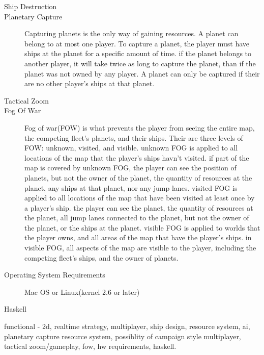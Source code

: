 \begin{description}
\item[Ship Destruction]






\item[Planetary Capture]
Capturing planets is the only way of gaining resources.
A planet can belong to at most one player.
To capture a planet, the player must have ships at the planet for a specific amount of time.
if the planet belongs to another player, it will take twice as long to capture the planet, than if the planet was not owned by any player.
A planet can only be captured if their are no other player's ships at that planet.


\item[Tactical Zoom]


\item[Fog Of War]
Fog of war(FOW) is what prevents the player from seeing the entire map, the competing fleet's planets, and their ships.
Their are three levels of FOW: unknown, visited, and visible.
unknown FOG is applied to all locations of the map that the player's ships havn't visited.
if part of the map is covered by unknown FOG, the player can see the position of planets, but not the owner of the planet, the quantity of resources at the planet, any ships at that planet, nor any jump lanes.
visited FOG is applied to all locations of the map that have been visited at least once by a player's ship.
the player can see the planet, the quantity of resources at the planet, all jump lanes connected to the planet, but not the owner of the planet, or the ships at the planet.
visible FOG is applied to worlds that the player owns, and all areas of the map that have the player's ships.
in visible FOG, all aspects of the map are visible to the player, including the competing fleet's ships, and the owner of planets.



\item[Operating System Requirements]
Mac OS or Linux(kernel 2.6 or later) 

\item[Haskell]

\end{description}

functional - 2d, realtime strategy, multiplayer, ship design, resource system, ai, planetary capture resource system, possiblity of campaign style multiplayer, tactical zoom/gameplay, fow, hw requirements, haskell.


